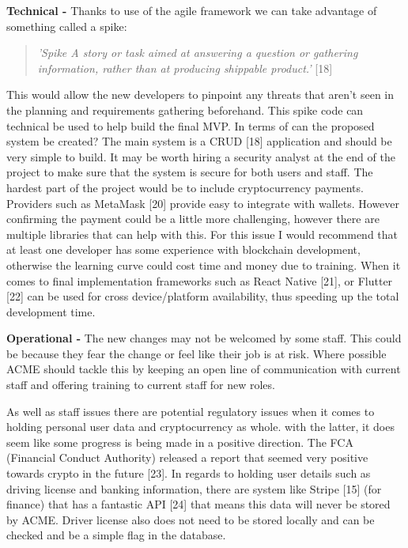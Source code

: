   \noindent\textbf{Technical -} Thanks to use of the agile framework we can take advantage of something called a spike:
  \begin{quote}
    \textit{'Spike A story or task aimed at answering a question or gathering information, rather than at producing shippable product.'} [18]
  \end{quote}
  This would allow the new developers to pinpoint any threats that aren't seen in the planning and requirements gathering beforehand. This spike code can technical
  be used to help build the final MVP. In terms of can the proposed system be created? The main system is a CRUD [18] application
  and should be very simple to build. It may be worth hiring a security analyst at the end of the project to make sure that the system is secure for both users 
  and staff.
  The hardest part of the project would be to include cryptocurrency payments. Providers such as MetaMask [20] provide easy to integrate with
  wallets. However confirming the payment could be a little more challenging, however there are multiple libraries that can help with this. For this issue I would
  recommend that at least one developer has some experience with blockchain development, otherwise the learning curve could cost time and money due to training.
  When it comes to final implementation frameworks such as React Native [21], or Flutter [22] can be used for cross device/platform availability, thus speeding up the
  total development time.
  \vspace{0.2cm}

  \noindent\textbf{Operational -} The new changes may not be welcomed by some staff. This could be because they fear the change or feel like their job is at risk.
  Where possible ACME should tackle this by keeping an open line of communication with current staff and offering training to current staff for new roles.

  As well as staff issues there are potential regulatory issues when it comes to holding personal user data and cryptocurrency as whole. with the latter, it
  does seem like some progress is being made in a positive direction. The FCA (Financial Conduct Authority) released a report that seemed very positive
  towards crypto in the future [23]. In regards to holding user details such as driving license and banking information, there are system like Stripe [15] 
  (for finance) that has a fantastic API [24] that means this data will never be stored by ACME. Driver license also does not need to be stored locally and can be 
  checked and be a simple flag in the database.

\newpage